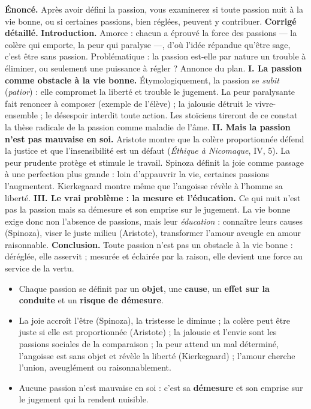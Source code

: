 \documentclass[11pt]{article}
\begin{document}
\begin{exoresolu}
\textbf{Énoncé.} Après avoir défini la passion, vous examinerez si toute passion nuit à la vie bonne, ou si certaines passions, bien réglées, peuvent y contribuer.
\tcblower
\textbf{Corrigé détaillé.}
\textbf{Introduction.} Amorce : chacun a éprouvé la force des passions — la colère qui emporte, la peur qui paralyse —, d'où l'idée répandue qu'être sage, c'est être sans passion. Problématique : la passion est-elle par nature un trouble à éliminer, ou seulement une puissance à régler ? Annonce du plan.
\textbf{I. La passion comme obstacle à la vie bonne.} Étymologiquement, la passion se \emph{subit} (\emph{patior}) : elle compromet la liberté et trouble le jugement. La peur paralysante fait renoncer à composer (exemple de l'élève) ; la jalousie détruit le vivre-ensemble ; le désespoir interdit toute action. Les stoïciens tireront de ce constat la thèse radicale de la passion comme maladie de l'âme.
\textbf{II. Mais la passion n'est pas mauvaise en soi.} Aristote montre que la colère proportionnée défend la justice et que l'insensibilité est un défaut (\emph{Éthique à Nicomaque}, IV, 5). La peur prudente protège et stimule le travail. Spinoza définit la joie comme passage à une perfection plus grande : loin d'appauvrir la vie, certaines passions l'augmentent. Kierkegaard montre même que l'angoisse révèle à l'homme sa liberté.
\textbf{III. Le vrai problème : la mesure et l'éducation.} Ce qui nuit n'est pas la passion mais sa démesure et son emprise sur le jugement. La vie bonne exige donc non l'absence de passions, mais leur \emph{éducation} : connaître leurs causes (Spinoza), viser le juste milieu (Aristote), transformer l'amour aveugle en amour raisonnable.
\textbf{Conclusion.} Toute passion n'est pas un obstacle à la vie bonne : déréglée, elle asservit ; mesurée et éclairée par la raison, elle devient une force au service de la vertu.
\end{exoresolu}

\begin{aretenir}
\begin{itemize}
\item Chaque passion se définit par un \textbf{objet}, une \textbf{cause}, un \textbf{effet sur la conduite} et un \textbf{risque de démesure}.
\item La joie accroît l'être (Spinoza), la tristesse le diminue ; la colère peut être juste si elle est proportionnée (Aristote) ; la jalousie et l'envie sont les passions sociales de la comparaison ; la peur attend un mal déterminé, l'angoisse est sans objet et révèle la liberté (Kierkegaard) ; l'amour cherche l'union, aveuglément ou raisonnablement.
\item Aucune passion n'est mauvaise en soi : c'est sa \textbf{démesure} et son emprise sur le jugement qui la rendent nuisible.
\end{itemize}
\end{aretenir}
\end{document}
